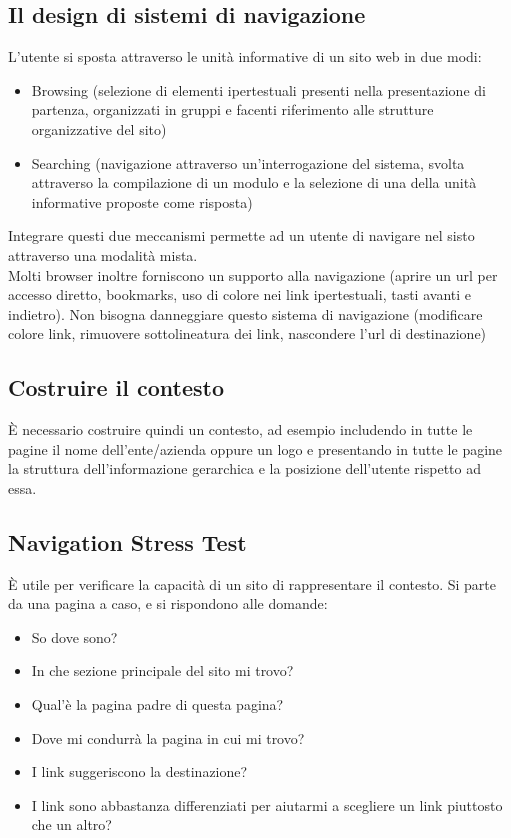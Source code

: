 \documentclass{article}
\begin{document}
\subsection{Il design di sistemi di navigazione}
L'utente si sposta attraverso le unità informative di un sito web in due modi:
\begin{itemize}
	\item Browsing (selezione di elementi ipertestuali presenti nella presentazione di partenza, organizzati in gruppi e facenti riferimento alle strutture organizzative del sito)
	\item Searching (navigazione attraverso un'interrogazione del sistema, svolta attraverso la compilazione di un modulo e la selezione di una della unità informative proposte come risposta)
\end{itemize}
Integrare questi due meccanismi permette ad un utente di navigare nel sisto attraverso una modalità mista.\\
Molti browser inoltre forniscono un supporto alla navigazione (aprire un url per accesso diretto, bookmarks, uso di colore nei link ipertestuali, tasti avanti e indietro). Non bisogna danneggiare questo sistema di navigazione (modificare colore link, rimuovere sottolineatura dei link, nascondere l'url di destinazione)
\subsection{Costruire il contesto}
È necessario costruire quindi un contesto, ad esempio includendo in tutte le pagine il nome dell'ente/azienda oppure un logo e presentando in tutte le pagine la struttura dell'informazione gerarchica e la posizione dell'utente rispetto ad essa.
\subsection{Navigation Stress Test}
È utile per verificare la capacità di un sito di rappresentare il contesto.
Si parte da una pagina a caso, e si rispondono alle domande:
\begin{itemize}
	\item So dove sono?
	\item In che sezione principale del sito mi trovo?
	\item Qual'è la pagina padre di questa pagina?
	\item Dove mi condurrà la pagina in cui mi trovo?
	\item I link suggeriscono la destinazione?
	\item I link sono abbastanza differenziati per aiutarmi a scegliere un link piuttosto che un altro?
\end{itemize}
\end{document}

